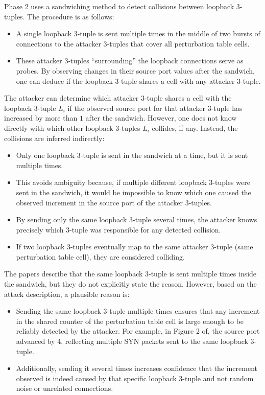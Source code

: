 \documentclass{report}
\begin{document}
Phase 2 uses a \alert{sandwiching method} to detect collisions between loopback 3-tuples. The procedure is as follows:

\begin{itemize}
    \item A single loopback 3-tuple is sent multiple times in the middle of two bursts of connections to the attacker 3-tuples that cover all perturbation table cells.
    \item These attacker 3-tuples “surrounding” the loopback connections serve as probes. By observing changes in their source port values after the sandwich, one can deduce if the loopback 3-tuple shares a cell with any attacker 3-tuple.
\end{itemize}

The attacker can determine which attacker 3-tuple shares a cell with the loopback 3-tuple $L_i$ if the observed source port for that attacker 3-tuple has increased by more than $1$ after the sandwich. However, one does not know directly with which other loopback 3-tuples $L_i$ collides, if any. Instead, the collisions are inferred indirectly:

\begin{itemize}
    \item Only one loopback 3-tuple is sent in the sandwich at a time, but it is sent multiple times.
    \item This avoids ambiguity because, if multiple different loopback 3-tuples were sent in the sandwich, it would be impossible to know which one caused the observed increment in the source port of the attacker 3-tuples.
    \item By sending only the same loopback 3-tuple several times, the attacker knows precisely which 3-tuple was responsible for any detected collision.
    \item If two loopback 3-tuples eventually map to the same attacker 3-tuple (same perturbation table cell), they are considered colliding.
\end{itemize}

The papers describe that the same loopback 3-tuple is sent multiple times inside the sandwich, but they do not explicitly state the reason. However, based on the attack description, a plausible reason is:

\begin{itemize}
    \item Sending the same loopback 3-tuple multiple times ensures that any increment in the shared counter of the perturbation table cell is large enough to be reliably detected by the attacker. For example, in Figure 2 of, the source port advanced by 4, reflecting multiple SYN packets sent to the same loopback 3-tuple.
    \item Additionally, sending it several times increases confidence that the increment observed is indeed caused by that specific loopback 3-tuple and not random noise or unrelated connections.
\end{itemize}
\end{document}
